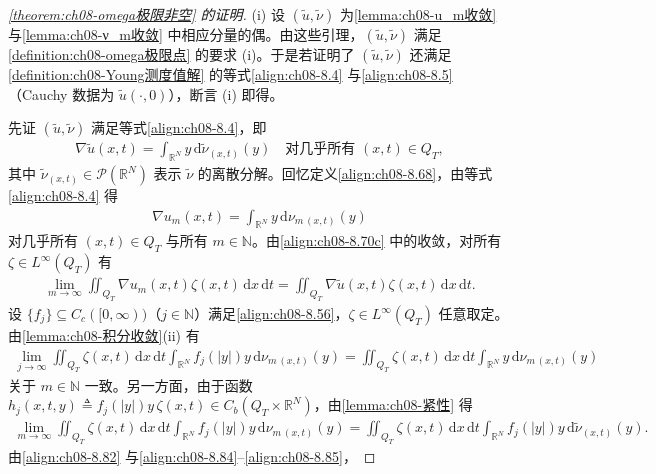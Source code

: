 \documentclass[../../main.tex]{subfiles}%
\begin{document}
\begin{proof}[\cref{theorem:ch08-omega极限非空} 的证明]
(i) 设 $(\tilde u,\tilde\nu)$ 为\cref{lemma:ch08-u_m收敛} 与\cref{lemma:ch08-ν_m收敛} 中相应分量的偶。由这些引理，$(\tilde u,\tilde\nu)$ 满足\cref{definition:ch08-omega极限点} 的要求 (i)。于是若证明了 $(\tilde u,\tilde\nu)$ 还满足\cref{definition:ch08-Young测度值解} 的等式\eqref{align:ch08-8.4} 与\eqref{align:ch08-8.5}（Cauchy 数据为 $\tilde u(\cdot,0)$），断言 (i) 即得。

先证 $(\tilde u,\tilde\nu)$ 满足等式\eqref{align:ch08-8.4}，即
\begin{align}
\nabla\tilde u(x,t)=\int_{\mathbb{R}^N}y\,\mathrm{d}\tilde\nu_{(x,t)}(y)
\quad\text{对几乎所有 }(x,t)\in Q_T, \label{align:ch08-8.81}
\end{align}
其中 $\tilde\nu_{(x,t)}\in\mathcal{P}(\mathbb{R}^N)$ 表示 $\tilde\nu$ 的离散分解。回忆定义\eqref{align:ch08-8.68}，由等式\eqref{align:ch08-8.4} 得
\begin{align}
\nabla u_m(x,t)=\int_{\mathbb{R}^N}y\,\mathrm{d}\nu_{m\,(x,t)}(y) \label{align:ch08-8.82}
\end{align}
对几乎所有 $(x,t)\in Q_T$ 与所有 $m\in\mathbb{N}$。由\eqref{align:ch08-8.70c} 中的收敛，对所有 $\zeta\in L^\infty(Q_T)$ 有
\begin{align}
\lim_{m\to\infty}\iint_{Q_T}\nabla u_m(x,t)\zeta(x,t)\,\mathrm{d}x\,\mathrm{d}t
=\iint_{Q_T}\nabla\tilde u(x,t)\zeta(x,t)\,\mathrm{d}x\,\mathrm{d}t. \label{align:ch08-8.83}
\end{align}
设 $\{f_j\}\subseteq C_c([0,\infty))$（$j\in\mathbb{N}$）满足\eqref{align:ch08-8.56}，$\zeta\in L^\infty(Q_T)$ 任意取定。由\cref{lemma:ch08-积分收敛}(ii) 有
\begin{align}
\lim_{j\to\infty}\iint_{Q_T}\zeta(x,t)\,\mathrm{d}x\,\mathrm{d}t\int_{\mathbb{R}^N}f_j(|y|)y\,\mathrm{d}\nu_{m\,(x,t)}(y)
=\iint_{Q_T}\zeta(x,t)\,\mathrm{d}x\,\mathrm{d}t\int_{\mathbb{R}^N}y\,\mathrm{d}\nu_{m\,(x,t)}(y) \label{align:ch08-8.84}
\end{align}
关于 $m\in\mathbb{N}$ 一致。另一方面，由于函数 $h_j(x,t,y)\triangleq f_j(|y|)y\,\zeta(x,t)\in C_b(Q_T\times\mathbb{R}^N)$，由\cref{lemma:ch08-紧性} 得
\begin{align}
\lim_{m\to\infty}\iint_{Q_T}\zeta(x,t)\,\mathrm{d}x\,\mathrm{d}t\int_{\mathbb{R}^N}f_j(|y|)y\,\mathrm{d}\nu_{m\,(x,t)}(y)
=\iint_{Q_T}\zeta(x,t)\,\mathrm{d}x\,\mathrm{d}t\int_{\mathbb{R}^N}f_j(|y|)y\,\mathrm{d}\tilde\nu_{(x,t)}(y). \label{align:ch08-8.85}
\end{align}
由\eqref{align:ch08-8.82} 与\eqref{align:ch08-8.84}--\eqref{align:ch08-8.85}，

\end{proof}
\end{document}
